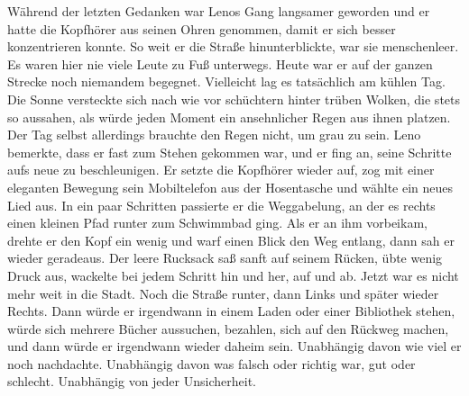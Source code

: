 \documentclass[ngerman,smalldemyvopaper,11pt,oneside,onecolumn,openright,extrafontsizes]{memoir}
\begin{document}
Während der letzten Gedanken war Lenos Gang langsamer geworden und er hatte die Kopfhörer aus seinen Ohren genommen, damit er sich besser konzentrieren konnte. So weit er die Straße hinunterblickte, war sie menschenleer. Es waren hier nie viele Leute zu Fuß unterwegs. Heute war er auf der ganzen Strecke noch niemandem begegnet. Vielleicht lag es tatsächlich am kühlen Tag. Die Sonne versteckte sich nach wie vor schüchtern hinter trüben Wolken, die stets so aussahen, als würde jeden Moment ein ansehnlicher Regen aus ihnen platzen. Der Tag selbst allerdings brauchte den Regen nicht, um grau zu sein. Leno bemerkte, dass er fast zum Stehen gekommen war, und er fing an, seine Schritte aufs neue zu beschleunigen. Er setzte die Kopfhörer wieder auf, zog mit einer eleganten Bewegung sein Mobiltelefon aus der Hosentasche und wählte ein neues Lied aus. In ein paar Schritten passierte er die Weggabelung, an der es rechts einen kleinen Pfad runter zum Schwimmbad ging. Als er an ihm vorbeikam, drehte er den Kopf ein wenig und warf einen Blick den Weg entlang, dann sah er wieder geradeaus. Der leere Rucksack saß sanft auf seinem Rücken, übte wenig Druck aus, wackelte bei jedem Schritt hin und her, auf und ab. Jetzt war es nicht mehr weit in die Stadt. Noch die Straße runter, dann Links und später wieder Rechts. Dann würde er irgendwann in einem Laden oder einer Bibliothek stehen, würde sich mehrere Bücher aussuchen, bezahlen, sich auf den Rückweg machen, und dann würde er irgendwann wieder daheim sein. Unabhängig davon wie viel er noch nachdachte. Unabhängig davon was falsch oder richtig war, gut oder schlecht. Unabhängig von jeder Unsicherheit.
\vspace{0.5em} \\
\end{document}
